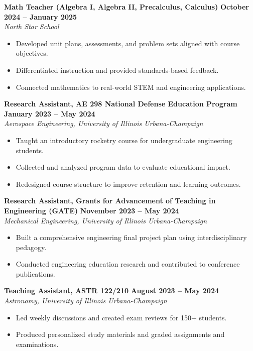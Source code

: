 \documentclass[10pt]{article}
\begin{document}
	\textbf{Math Teacher (Algebra I, Algebra II, Precalculus, Calculus)} \hfill \textbf{October 2024 -- January 2025} \\
	\emph{North Star School}
	\begin{itemize}
		\item Developed unit plans, assessments, and problem sets aligned with course objectives.
		\item Differentiated instruction and provided standards-based feedback.
		\item Connected mathematics to real-world STEM and engineering applications.
	\end{itemize}
	
	\textbf{Research Assistant, AE 298 National Defense Education Program} \hfill \textbf{January 2023 -- May 2024} \\
	\emph{Aerospace Engineering, University of Illinois Urbana-Champaign}
	\begin{itemize}
		\item Taught an introductory rocketry course for undergraduate engineering students.
		\item Collected and analyzed program data to evaluate educational impact.
		\item Redesigned course structure to improve retention and learning outcomes.
	\end{itemize}
	
	\textbf{Research Assistant, Grants for Advancement of Teaching in Engineering (GATE)} \hfill \textbf{November 2023 -- May 2024} \\
	\emph{Mechanical Engineering, University of Illinois Urbana-Champaign}
	\begin{itemize}
		\item Built a comprehensive engineering final project plan using interdisciplinary pedagogy.
		\item Conducted engineering education research and contributed to conference publications.
	\end{itemize}
	
	\textbf{Teaching Assistant, ASTR 122/210} \hfill \textbf{August 2023 -- May 2024} \\
	\emph{Astronomy, University of Illinois Urbana-Champaign}
	\begin{itemize}
		\item Led weekly discussions and created exam reviews for 150+ students.
		\item Produced personalized study materials and graded assignments and examinations.
	\end{itemize}
	
\end{document}
